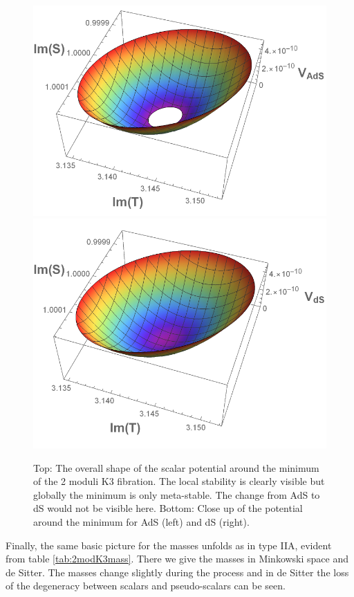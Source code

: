 \documentclass[a4paper,12pt]{report}
\begin{document}
\begin{figure}[H]
\centering
\includegraphics[scale=0.55]{quevedo_314_3D_Ads.pdf} \qquad
\includegraphics[scale=0.53]{quevedo_314_3D_ds.pdf}
\caption{Top: The overall shape of the scalar potential around the minimum of the 2 moduli K3 fibration. The local stability is clearly visible but globally the minimum is only meta-stable. The change from AdS to dS would not be visible here. Bottom: Close up of the potential around the minimum for AdS (left) and dS (right).}
\label{fig:2modK33d}
\end{figure}
Finally, the same basic picture for the masses unfolds as in type IIA, evident from table \ref{tab:2modK3mass}. There we give the masses in Minkowski space and de Sitter. The masses change slightly during the process and in de Sitter the loss of the degeneracy between scalars and pseudo-scalars can be seen.
\end{document}
